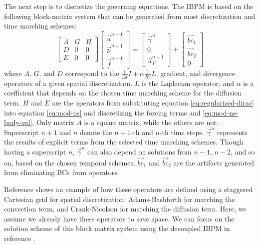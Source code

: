 The next step is to discretize the governing equations.
The IBPM is based on the following block-matrix system that can be generated from most discretization and time marching schemes:
\begin{equation}\label{eq:block-sys-ns}
    \begin{bmatrix}
        A & G & H \\
        D & 0 & 0 \\
        E & 0 & 0
    \end{bmatrix}
    \begin{bmatrix}
        \vec{u}^{n+1} \\
        \vec{p}^{n+1} \\
        \vec{f}^{n+1}
    \end{bmatrix}
    =
    \begin{bmatrix}
        \vec{\gamma}^n \\
        0 \\
        \vec{u}_\Gamma^{n+1}
    \end{bmatrix}
    +
    \begin{bmatrix}
        \vec{bc}_1 \\
        \vec{bc}_2 \\
        0
    \end{bmatrix}
\end{equation}
where $A$, $G$, and $D$ correspond to the $\frac{1}{\Delta t}I+\alpha\frac{1}{Re}L$, gradient, and divergence operators of a given spatial discretization. 
$L$ is the Laplacian operator, and $\alpha$ is a coefficient that depends on the chosen time marching scheme for the diffusion term.
$H$ and $E$ are the operators from substituting equation \eqref{eq:regularized-dirac} into equation \eqref{eq:mod-ns} and discretizing the forcing terms and \eqref{eq:mod-ns-body-vel}.
Only matrix $A$ is a square matrix, while the others are not.
Superscript $n+1$ and $n$ denote the $n+1$-th and $n$-th time steps.
$\vec{\gamma}^n$ represents the results of explicit terms from the selected time marching schemes.
Though having a superscript $n$, $\vec{\gamma}^n$ can also depend on solutions from $n-1$, $n-2$, and so on, based on the chosen temporal schemes.
$\vec{bc}_1$ and $\vec{bc}_2$ are the artifacts generated from eliminating BCs from operators.

Reference \cite{taira_immersed_2007} shows an example of how these operators are defined using a staggered Cartesian grid for spatial discretization, Adams-Bashforth for marching the convection term, and Crank-Nicolson for marching the diffusion term.
Here, we assume we already have these operators to save space.
We can focus on the solution scheme of this block matrix system using the decoupled IBPM in reference \cite{li_efficient_2016}.

